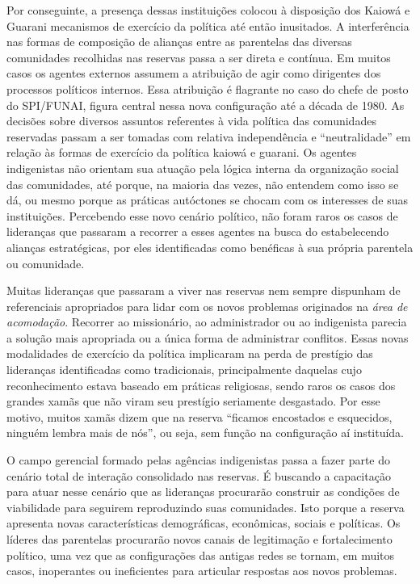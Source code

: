 Por conseguinte, a presença dessas instituições colocou à disposição dos
Kaiowá e Guarani mecanismos de exercício da política até então
inusitados. A interferência nas formas de composição de alianças entre
as parentelas das diversas comunidades recolhidas nas reservas passa a
ser direta e contínua. Em muitos casos os agentes externos assumem a
atribuição de agir como dirigentes dos processos políticos internos.
Essa atribuição é flagrante no caso do chefe de posto do SPI/FUNAI,
figura central nessa nova configuração até a década de 1980. As decisões
sobre diversos assuntos referentes à vida política das comunidades
reservadas passam a ser tomadas com relativa independência e
``neutralidade'' em relação às formas de exercício da política kaiowá e
guarani. Os agentes indigenistas não orientam sua atuação pela lógica
interna da organização social das comunidades, até porque, na maioria
das vezes, não entendem como isso se dá, ou mesmo porque as práticas
autóctones se chocam com os interesses de suas instituições. Percebendo
esse novo cenário político, não foram raros os casos de lideranças que
passaram a recorrer a esses agentes na busca do estabelecendo alianças
estratégicas, por eles identificadas como benéficas à sua própria
parentela ou comunidade.

Muitas lideranças que passaram a viver nas reservas nem sempre dispunham
de referenciais apropriados para lidar com os novos problemas originados
na \emph{área de acomodação}. Recorrer ao missionário, ao administrador
ou ao indigenista parecia a solução mais apropriada ou a única forma de
administrar conflitos. Essas novas modalidades de exercício da política
implicaram na perda de prestígio das lideranças identificadas como
tradicionais, principalmente daquelas cujo reconhecimento estava baseado
em práticas religiosas, sendo raros os casos dos grandes xamãs que não
viram seu prestígio seriamente desgastado. Por esse motivo, muitos xamãs
dizem que na reserva ``ficamos encostados e esquecidos, ninguém lembra
mais de nós'', ou seja, sem função na configuração aí instituída.

O campo gerencial formado pelas agências indigenistas passa a fazer
parte do cenário total de interação consolidado nas reservas. É buscando
a capacitação para atuar nesse cenário que as lideranças procurarão
construir as condições de viabilidade para seguirem reproduzindo suas
comunidades. Isto porque a reserva apresenta novas características
demográficas, econômicas, sociais e políticas. Os líderes das parentelas
procurarão novos canais de legitimação e fortalecimento político, uma
vez que as configurações das antigas redes se tornam, em muitos casos,
inoperantes ou ineficientes para articular respostas aos novos
problemas.

